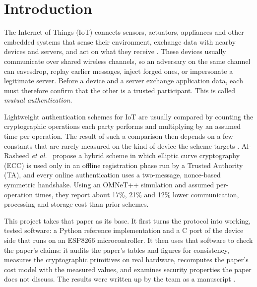 \documentclass[12pt,a4paper,oneside]{report}
\numberwithin{equation}{chapter}
\begin{document}
\section{Introduction}
The Internet of Things (IoT) connects sensors, actuators, appliances and other embedded systems that sense their environment, exchange data with nearby devices and servers, and act on what they receive \cite{alrasheed2026hybrid}. These devices usually communicate over shared wireless channels, so an adversary on the same channel can eavesdrop, replay earlier messages, inject forged ones, or impersonate a legitimate server. Before a device and a server exchange application data, each must therefore confirm that the other is a trusted participant. This is called \emph{mutual authentication}.

Lightweight authentication schemes for IoT are usually compared by counting the cryptographic operations each party performs and multiplying by an assumed time per operation. The result of such a comparison then depends on a few constants that are rarely measured on the kind of device the scheme targets \cite{kerkar2026audit}. Al-Rasheed \emph{et al.}\ \cite{alrasheed2026hybrid} propose a hybrid scheme in which elliptic curve cryptography (ECC) is used only in an offline registration phase run by a Trusted Authority (TA), and every online authentication uses a two-message, nonce-based symmetric handshake. Using an OMNeT++ simulation and assumed per-operation times, they report about 17\%, 21\% and 12\% lower communication, processing and storage cost than prior schemes.

This project takes that paper as its base. It first turns the protocol into working, tested software: a Python reference implementation and a C port of the device side that runs on an ESP8266 microcontroller. It then uses that software to check the paper's claims: it audits the paper's tables and figures for consistency, measures the cryptographic primitives on real hardware, recomputes the paper's cost model with the measured values, and examines security properties the paper does not discuss. The results were written up by the team as a manuscript \cite{kerkar2026audit}.
\end{document}
